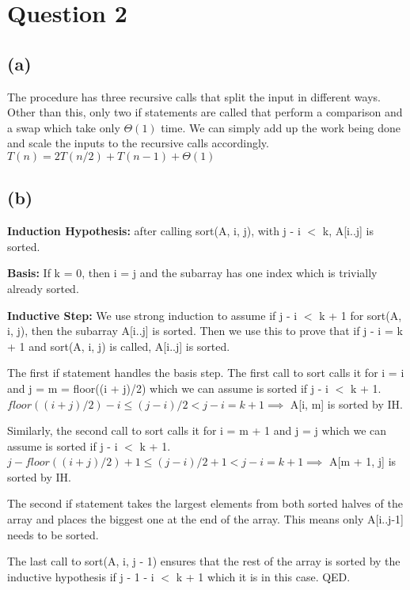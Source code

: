 \section{Question 2}
    \subsection{(a)}
    The procedure has three recursive calls that split the input in different ways. Other than this, only two if statements are called that perform a comparison and a swap which take only $\Theta(1)$ time. We can simply add up the work being done and scale the inputs to the recursive calls accordingly.
    $T(n) = 2T(n/2) + T(n - 1) + \Theta(1)$

    \subsection{(b)}
    \textbf{Induction Hypothesis:} after calling sort(A, i, j), with j - i $<$ k, A[i..j] is sorted.

    \textbf{Basis:} If k = 0, then i = j and the subarray has one index which is trivially already sorted.

    \textbf{Inductive Step:} We use strong induction to assume if j - i $<$ k + 1 for sort(A, i, j), then the subarray A[i..j] is sorted. Then we use this to prove that if j - i = k + 1 and sort(A, i, j) is called, A[i..j] is sorted.

    The first if statement handles the basis step.
    The first call to sort calls it for i = i and j = m = floor((i + j)/2) which we can assume is sorted if j - i $<$ k + 1. $floor((i + j)/2) - i \leq (j - i)/2 < j - i = k + 1 \implies $ A[i, m] is sorted by IH.
    
    Similarly, the second call to sort calls it for i = m + 1 and j = j which we can assume is sorted if j - i $<$ k + 1. $j - floor((i + j)/2) + 1 \leq (j - i)/2 + 1 < j - i = k + 1 \implies $ A[m + 1, j] is sorted by IH.

    The second if statement takes the largest elements from both sorted halves of the array and places the biggest one at the end of the array. This means only A[i..j-1] needs to be sorted.

    The last call to sort(A, i, j - 1) ensures that the rest of the array is sorted by the inductive hypothesis if j - 1 - i $<$ k + 1 which it is in this case. QED.


